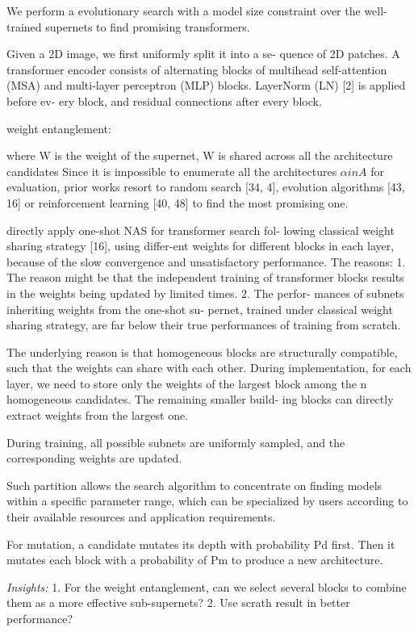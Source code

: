\documentclass[UTF8]{article}
\begin{document}
We perform a evolutionary search with a model size constraint over the well-trained supernets to find promising transformers.

Given a 2D image, we first uniformly split it into a se- quence of 2D patches. A transformer encoder consists of alternating blocks of multihead self-attention (MSA) and multi-layer perceptron (MLP) blocks. LayerNorm (LN) [2] is applied before ev- ery block, and residual connections after every block.

weight entanglement:

where W is the weight of the supernet, W is shared across all the architecture candidates
Since it is impossible to enumerate all the architectures $\alpha in A$ for evaluation, prior works resort to random search [34, 4], evolution algorithms [43, 16] or reinforcement learning [40, 48] to find the most promising one.

directly apply one-shot NAS for transformer search fol- lowing classical weight sharing strategy [16], using differ-ent weights for different blocks in each layer, because of the slow convergence and unsatisfactory performance. The reasons: 1. The reason might be that the independent training of transformer blocks results in the weights being updated by limited times. 2. The perfor- mances of subnets inheriting weights from the one-shot su- pernet, trained under classical weight sharing strategy, are far below their true performances of training from scratch. 

The underlying reason is that homogeneous blocks are structurally compatible, such that the weights can share with each other. During implementation, for each layer, we need to store only the weights of the largest block among the n homogeneous candidates. The remaining smaller build- ing blocks can directly extract weights from the largest one.

During training, all possible subnets are uniformly sampled, and the corresponding weights are updated.

Such partition allows the search algorithm to concentrate on finding models within a specific parameter range, which can be specialized by users according to their available resources and application requirements.

For mutation, a candidate mutates its depth with probability Pd first. Then it mutates each block with a probability of Pm to produce a new architecture.

\emph{Insights:} 1. For the weight entanglement, can we select several blocks to combine them as a more effective sub-supernets?  2. Use scrath result in better performance?
\end{document}
